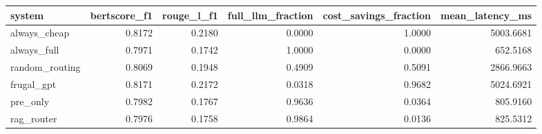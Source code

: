 \begin{tabular}{lrrrrr}
\toprule
system & bertscore_f1 & rouge_l_f1 & full_llm_fraction & cost_savings_fraction & mean_latency_ms \\
\midrule
always_cheap & 0.8172 & 0.2180 & 0.0000 & 1.0000 & 5003.6681 \\
always_full & 0.7971 & 0.1742 & 1.0000 & 0.0000 & 652.5168 \\
random_routing & 0.8069 & 0.1948 & 0.4909 & 0.5091 & 2866.9663 \\
frugal_gpt & 0.8171 & 0.2172 & 0.0318 & 0.9682 & 5024.6921 \\
pre_only & 0.7982 & 0.1767 & 0.9636 & 0.0364 & 805.9160 \\
rag_router & 0.7976 & 0.1758 & 0.9864 & 0.0136 & 825.5312 \\
\bottomrule
\end{tabular}
